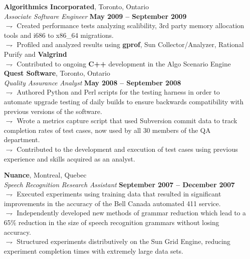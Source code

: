 \documentclass[margin,line]{resume}
\begin{document}
\begin{resume}
    \textbf{Algorithmics Incorporated}, Toronto, Ontario \vspace{2mm}\\\vspace{1mm}%
    \textsl{Associate Software Engineer} \hfill \textbf{May 2009 -- September 2009}\\
	$\rightharpoondown$ Created performance tests analyzing scalibility, 3rd party memory allocation tools and i686 to x86\_64 migrations. \\
	$\rightharpoondown$ Profiled and analyzed results using \textbf{gprof}, Sun Collector/Analyzer, Rational Purify and \textbf{Valgrind} \\
	$\rightharpoondown$ Contributed to ongoing \textbf{C++} development in the Algo Scenario Engine \\


    \textbf{Quest Software}, Toronto, Ontario \vspace{2mm}\\\vspace{1mm}%
    \textsl{Quality Assurance Analyst} \hfill \textbf{May 2008 -- September 2008}\\
	$\rightharpoondown$ Authored Python and Perl scripts for the testing harness in order to automate upgrade testing of daily builds to ensure backwards compatibility with previous versions of the software. \\
	$\rightharpoondown$ Wrote a metrics capture script that used Subversion commit data to track completion rates of test cases, now used by all 30 members of the QA department. \\
	$\rightharpoondown$ Contributed to the development and execution of test cases using previous experience and skills acquired as an analyst. \\

\pagebreak

    \textbf{Nuance}, Montreal, Quebec \vspace{2mm}\\\vspace{1mm}%
    \textsl{Speech Recognition Research Assistant} \hfill \textbf{September 2007 -- December 2007}\\
	$\rightharpoondown$ Executed experiments using training data that resulted in significant improvements in the accuracy of the Bell Canada automated 411 service. \\
	$\rightharpoondown$ Independently developed new methods of grammar reduction which lead to a 65\% reduction in the size of speech recognition grammars without losing accuracy. \\
	$\rightharpoondown$ Structured experiments distributively on the Sun Grid Engine, reducing experiment completion times with extremely large data sets. \\


\end{resume}
\end{document}
